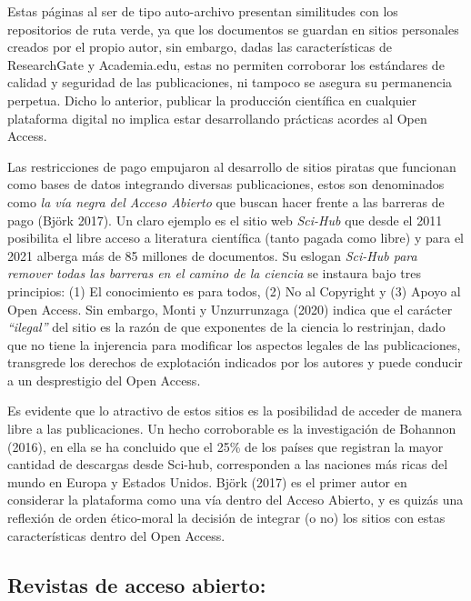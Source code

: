 \documentclass[
  spanish,
  letterpaper,
  DIV=11,
  numbers=noendperiod]{scrreprt}
\begin{document}
Estas páginas al ser de tipo auto-archivo presentan similitudes con los
repositorios de ruta verde, ya que los documentos se guardan en sitios
personales creados por el propio autor, sin embargo, dadas las
características de ResearchGate y Academia.edu, estas no permiten
corroborar los estándares de calidad y seguridad de las publicaciones,
ni tampoco se asegura su permanencia perpetua. Dicho lo anterior,
publicar la producción científica en cualquier plataforma digital no
implica estar desarrollando prácticas acordes al Open Access.

Las restricciones de pago empujaron al desarrollo de sitios piratas que
funcionan como bases de datos integrando diversas publicaciones, estos
son denominados como \emph{la vía negra del Acceso Abierto} que buscan
hacer frente a las barreras de pago (Björk 2017). Un claro ejemplo es el
sitio web \emph{Sci-Hub} que desde el 2011 posibilita el libre acceso a
literatura científica (tanto pagada como libre) y para el 2021 alberga
más de 85 millones de documentos. Su eslogan \emph{Sci-Hub para remover
todas las barreras en el camino de la ciencia} se instaura bajo tres
principios: (1) El conocimiento es para todos, (2) No al Copyright y (3)
Apoyo al Open Access. Sin embargo, Monti y Unzurrunzaga (2020) indica
que el carácter \emph{``ilegal''} del sitio es la razón de que
exponentes de la ciencia lo restrinjan, dado que no tiene la injerencia
para modificar los aspectos legales de las publicaciones, transgrede los
derechos de explotación indicados por los autores y puede conducir a un
desprestigio del Open Access.

Es evidente que lo atractivo de estos sitios es la posibilidad de
acceder de manera libre a las publicaciones. Un hecho corroborable es la
investigación de Bohannon (2016), en ella se ha concluido que el 25\% de
los países que registran la mayor cantidad de descargas desde Sci-hub,
corresponden a las naciones más ricas del mundo en Europa y Estados
Unidos. Björk (2017) es el primer autor en considerar la plataforma como
una vía dentro del Acceso Abierto, y es quizás una reflexión de orden
ético-moral la decisión de integrar (o no) los sitios con estas
características dentro del Open Access.

\subsection{Revistas de acceso
abierto:}\label{revistas-de-acceso-abierto}
\end{document}
